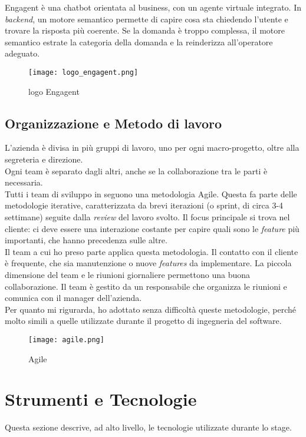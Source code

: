 Engagent è una chatbot orientata al business, con un agente virtuale integrato. In \textit{backend}, un motore semantico permette di capire cosa sta chiedendo l'utente e trovare la risposta più coerente. Se la domanda è troppo complessa, il motore semantico estrate la categoria della domanda e la reinderizza all'operatore adeguato.
\begin{figure}[H]
    \centering
    \texttt{[image: logo\_engagent.png]} 
    \caption{logo Engagent}
    \label{logo:company}
\end{figure}
\subsection{Organizzazione e Metodo di lavoro}
L'azienda è divisa in più gruppi di lavoro, uno per ogni macro-progetto, oltre alla segreteria e direzione.\\
Ogni team è separato dagli altri, anche se la collaborazione tra le parti è necessaria.\\
Tutti i team di sviluppo in \company{} seguono una metodologia Agile. Questa fa parte delle metodologie iterative, caratterizzata da brevi iterazioni (o sprint, di circa 3-4 settimane) seguite dalla \textit{review} del lavoro svolto. Il focus principale si trova nel cliente: ci deve essere una interazione costante per capire quali sono le \textit{feature} più importanti, che hanno precedenza sulle altre.\\
Il team a cui ho preso parte applica questa metodologia. Il contatto con il cliente è frequente, che sia manutenzione o nuove \textit{features} da implementare. La piccola dimensione del team e le riunioni giornaliere permettono una buona collaborazione. Il team è gestito da un responsabile che organizza le riunioni e comunica con il manager dell'azienda.\\
Per quanto mi rigurarda, ho adottato senza difficoltà queste metodologie, perché molto simili a quelle utilizzate durante il progetto di ingegneria del software.
\begin{figure}[H]
    \centering
    \texttt{[image: agile.png]} 
    \caption{Agile}
    \label{logo:company}
\end{figure}

\section{Strumenti e Tecnologie}
Questa sezione descrive, ad alto livello, le tecnologie utilizzate durante lo stage.
